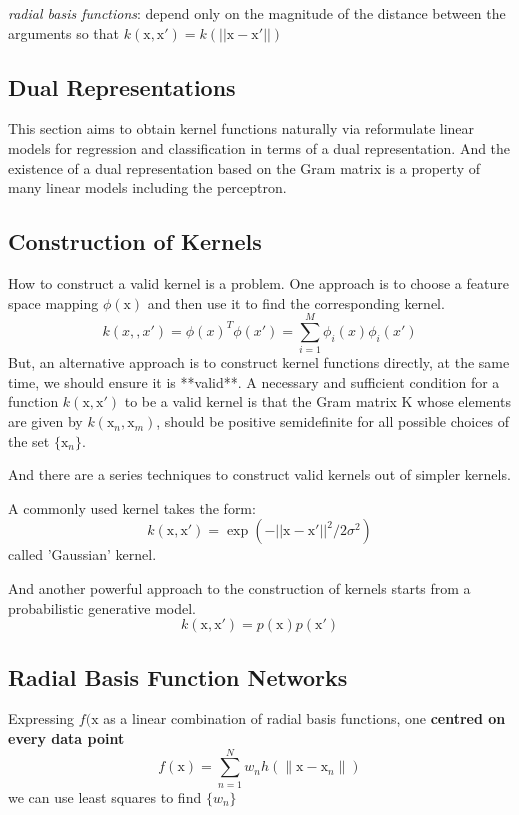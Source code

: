 \documentclass[a4paper]{book}
\begin{document}
\emph{radial basis functions}: depend only on the magnitude of the distance  between the arguments so that $k(\mathrm x,\mathrm x') = k(||\mathrm x-\mathrm x'||)$
\subsection{Dual Representations}
This section aims to obtain kernel functions naturally via reformulate linear models for regression and classification in terms of a dual representation.  And the existence of a dual representation based on the Gram matrix is a property of many linear models including the perceptron.
\subsection{ Construction of Kernels}
How to construct a valid kernel is a problem. One approach is to choose a feature space mapping $\phi(\mathrm x)$ and then use it to find the corresponding  kernel.
\begin{equation}
  k(x, ,x') = \phi(x)^T\phi(x') = \sum_{i=1}^M\phi_i(x)\phi_i(x')
\end{equation}
But, an alternative approach is to construct kernel functions directly, at the same time, we should ensure it is **valid**.  A necessary and sufficient condition for a function $k(\mathrm x, \mathrm  x') $ to be a valid kernel is that the Gram matrix $\mathrm  K$ whose elements are given by $k(\mathrm  x_n,\mathrm  x_m)$, should be positive semidefinite for all possible choices of the set $\{\mathrm  x_n\}$.

And there are a series techniques to construct valid kernels out of simpler kernels.

A commonly used kernel takes the form:
$$k(\mathrm  x,\mathrm  x') = \exp(-||\mathrm  x-\mathrm  x'||^2/2\sigma^2)$$
called 'Gaussian' kernel.

And another powerful approach to the construction of kernels starts from a probabilistic generative model.  $$k(\mathrm  x,\mathrm x') = p(\mathrm  x)p(\mathrm  x')$$
\subsection{Radial Basis Function Networks}
Expressing $f(\mathrm{x}$ as a linear combination of radial basis functions, one \textbf{centred on every data point}
\begin{equation}
  f(\mathrm{x})  = \sum_{n=1}^{N}w_nh(\parallel\mathrm{x}-\mathrm{x}_n\parallel)
\end{equation}
we can use least squares to find $\{w_n\}$
\end{document}
